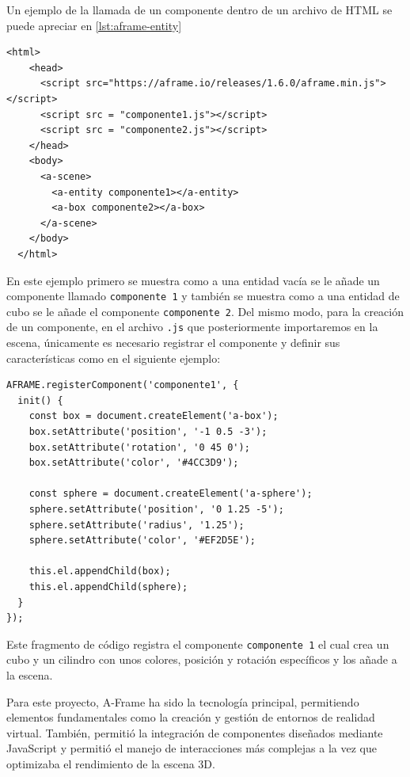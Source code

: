 \documentclass[a4paper, 12pt]{book}
\begin{document}
Un ejemplo de la llamada de un componente dentro de un archivo de HTML se puede apreciar en \ref{lst:aframe-entity}
\begin{lstlisting}[caption=Ejemplo de llamada de entidad, captionpos=b, label=lst:aframe-entity]
  <html>
    <head>
      <script src="https://aframe.io/releases/1.6.0/aframe.min.js"></script>
      <script src = "componente1.js"></script>
      <script src = "componente2.js"></script>
    </head>
    <body>
      <a-scene>
        <a-entity componente1></a-entity>
        <a-box componente2></a-box>
      </a-scene>
    </body>
  </html>
\end{lstlisting}

En este ejemplo primero se muestra como a una entidad vacía se le añade un componente llamado \texttt{componente 1} y también se muestra como a una entidad de cubo se le añade el componente \texttt{componente 2}.
Del mismo modo, para la creación de un componente, en el archivo \texttt{.js} que posteriormente importaremos en la escena, únicamente es necesario registrar el componente y definir sus características como en el siguiente ejemplo:

\begin{lstlisting}[caption=Ejemplo de creación de entidad, captionpos=b, label=lst:aframe-entity-creation]
  AFRAME.registerComponent('componente1', {
  init() {
    const box = document.createElement('a-box');
    box.setAttribute('position', '-1 0.5 -3');
    box.setAttribute('rotation', '0 45 0');
    box.setAttribute('color', '#4CC3D9');

    const sphere = document.createElement('a-sphere');
    sphere.setAttribute('position', '0 1.25 -5');
    sphere.setAttribute('radius', '1.25');
    sphere.setAttribute('color', '#EF2D5E');

    this.el.appendChild(box);
    this.el.appendChild(sphere);
  }
});
\end{lstlisting}

Este fragmento de código registra el componente \texttt{componente 1} el cual crea un cubo y un cilindro con unos colores, posición y rotación específicos y los añade a la escena.

Para este proyecto, A-Frame ha sido la tecnología principal, permitiendo elementos fundamentales como la creación y gestión de entornos de realidad virtual. 
También, permitió la integración de componentes diseñados mediante JavaScript y permitió el manejo de interacciones más complejas a la vez que optimizaba el rendimiento de la escena 3D.
\end{document}
